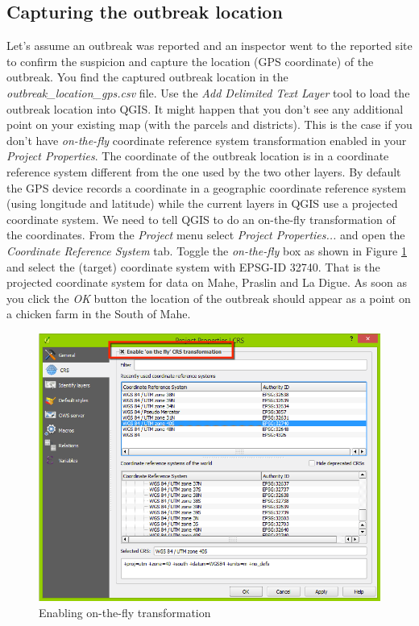 \documentclass[a4paper,12pt,titlepage]{article}
\begin{document}
\subsection{Capturing the outbreak location}
Let's assume an outbreak was reported and an inspector went to the reported site to confirm the suspicion and capture the location (GPS coordinate) of the outbreak. You find the captured outbreak location in the \textit{outbreak\_location\_gps.csv} file. Use the \textit{Add Delimited Text Layer} tool to load the outbreak location into QGIS. It might happen that you don't see any additional point on your existing map (with the parcels and districts). This is the case if you don't have \textit{on-the-fly} coordinate reference system transformation enabled in your \textit{Project Properties}. The coordinate of the outbreak location is in a coordinate reference system different from the one used by the two other layers. By default the GPS device records a coordinate in a geographic coordinate reference system (using longitude and latitude) while the current layers in QGIS use a projected coordinate system. We need to tell QGIS to do an on-the-fly transformation of the coordinates. From the \textit{Project} menu select \textit{Project Properties...} and open the \textit{Coordinate Reference System} tab. Toggle the \textit{on-the-fly} box as shown in Figure \ref{fig:on_the_fly} and select the (target) coordinate system with EPSG-ID 32740. That is the projected coordinate system for data on Mahe, Praslin and La Digue. As soon as you click the \textit{OK} button the location of the outbreak should appear as a point on a chicken farm in the South of Mahe.

\begin{figure}[htb]
\centering
\includegraphics[width=12cm]{Images/on_the_fly.png}
\caption{Enabling on-the-fly transformation}\label{fig:on_the_fly}
\end{figure}
\end{document}
